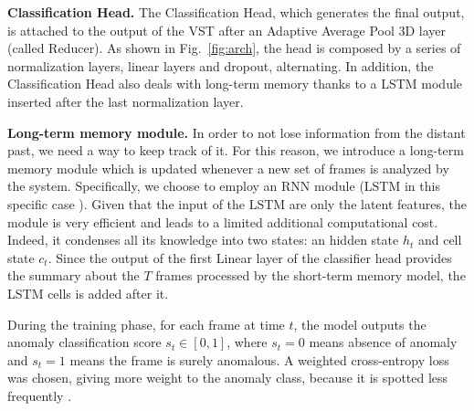 \noindent\textbf{Classification Head.}
The Classification Head, which generates the final output, is attached to the output of the VST after an Adaptive Average Pool 3D layer (called Reducer).
As shown in Fig.~\ref{fig:arch}, the head is composed by a series of normalization layers, linear layers and dropout, alternating. 
In addition, the Classification Head also deals with long-term memory thanks to a LSTM module inserted after the last normalization layer.






\noindent\textbf{Long-term memory module.}
In order to not lose information from the distant past, we need a way to keep track of it.
For this reason, we introduce a long-term memory module  which is updated whenever a new set of frames is analyzed by the system.
Specifically, we choose to employ an RNN module (LSTM in this specific case  ).
Given that the input of the LSTM  are only the latent features, the module is very efficient and leads to a limited additional computational cost.
Indeed, it condenses all its knowledge into two states: an hidden state $h_t$ and cell state $c_t$.
Since the output of the first Linear layer of the classifier head provides the summary about the $T$ frames processed by the short-term memory model, the LSTM cells is added after it.





During the training phase, for each frame at time $t$, the model outputs the anomaly classification score $s_t \in [0,1]$, where $s_t=0$ means absence of anomaly and $s_t=1$ means the frame is surely anomalous.
A weighted cross-entropy loss was chosen, giving more weight to the anomaly class, because it is spotted less frequently  .
